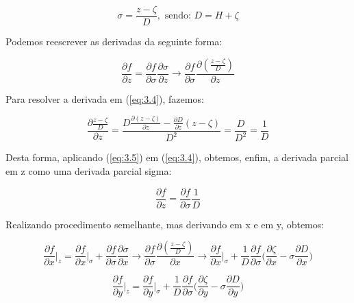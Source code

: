 \documentclass[11pt]{article}
\begin{document}
\begin{equation}
    \sigma = \frac{z - \zeta}{D}, \text{ sendo: } D = H + \zeta
\end{equation}

Podemos reescrever as derivadas da seguinte forma:

\begin{equation}
    \frac{\partial{f}}{\partial{z}} = \frac{\partial{f}}{\partial{\sigma}}\frac{\partial{\sigma}}{\partial{z}} \rightarrow \frac{\partial{f}}{\partial{\sigma}}\frac{\partial(\frac{z - \zeta}{D})}{\partial{z}}
    \label{eq:3.4}
\end{equation}

Para resolver a derivada em (\ref{eq:3.4}), fazemos:

\begin{equation}
    \frac{\partial{\frac{z - \zeta}{D}}}{\partial{z}} = \frac{D\frac{\partial{(z - \zeta)}}{\partial{z}} - \frac{\partial{D}}{\partial{z}}(z - \zeta)}{D^2} = \frac{D}{D^2} = \frac{1}{D}
    \label{eq:3.5}
\end{equation}

Desta forma, aplicando (\ref{eq:3.5}) em (\ref{eq:3.4}), obtemos, enfim,
a derivada parcial em z como uma derivada parcial sigma:

\begin{equation}
    \frac{\partial{f}}{\partial{z}} = \frac{\partial{f}}{\partial{\sigma}}\frac{1}{D}
    \label{eq:3.6}
\end{equation}

Realizando procedimento semelhante, mas derivando em x e em y, obtemos:

\begin{equation}
    \frac{\partial{f}}{\partial{x}} \bigg|_z=  \frac{\partial{f}}{\partial{x}} \bigg|_\sigma + \frac{\partial{f}}{\partial{\sigma}}\frac{\partial{\sigma}}{\partial{x}} \rightarrow \frac{\partial{f}}{\partial{\sigma}}\frac{\partial(\frac{z - \zeta}{D})}{\partial{x}} \rightarrow \frac{\partial{f}}{\partial{x}} \bigg|_\sigma +\frac{1}{D}\frac{\partial{f}}{\partial{\sigma}}\bigg( \frac{\partial{\zeta}}{\partial{x}} - \sigma\frac{\partial{D}}{\partial{x}} \bigg)
    \label{eq:3.7}
\end{equation}

\begin{equation}
    \frac{\partial{f}}{\partial{y}}\bigg|_z = \frac{\partial{f}}{\partial{y}}\bigg|_\sigma + \frac{1}{D}\frac{\partial{f}}{\partial{\sigma}}\bigg( \frac{\partial{\zeta}}{\partial{y}} - \sigma\frac{\partial{D}}{\partial{y}} \bigg)
    \label{eq:3.8}
\end{equation}
\end{document}
